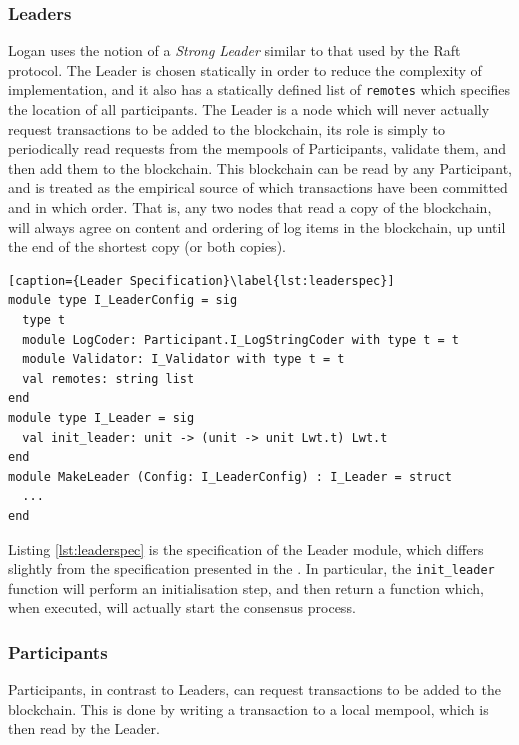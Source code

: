 \documentclass[12pt,a4paper,twoside,openright]{report}
\begin{document}
	\subsubsection*{Leaders}
	Logan uses the notion of a \textit{Strong Leader} similar to that used by the Raft protocol. 
	The Leader is chosen statically in order to reduce the complexity of implementation, and it also has a statically defined list of \texttt{remotes} which specifies the location of all participants.
	The Leader is a node which will never actually request transactions to be added to the blockchain, its role is simply to periodically read requests from the mempools of Participants, validate them, and then add them to the blockchain.
	This blockchain can be read by any Participant, and is treated as the empirical source of which transactions have been committed and in which order. 
	That is, any two nodes that read a copy of the blockchain, will always agree on content and ordering of log items in the blockchain, up until the end of the shortest copy (or both copies).\\

	\begin{lstlisting}[caption={Leader Specification}\label{lst:leaderspec}]
module type I_LeaderConfig = sig
  type t
  module LogCoder: Participant.I_LogStringCoder with type t = t   
  module Validator: I_Validator with type t = t 
  val remotes: string list
end
module type I_Leader = sig
  val init_leader: unit -> (unit -> unit Lwt.t) Lwt.t
end
module MakeLeader (Config: I_LeaderConfig) : I_Leader = struct
  ...
end
	\end{lstlisting}

	Listing \ref{lst:leaderspec} is the specification of the Leader module, which differs slightly from the specification presented in the .
	In particular, the \texttt{init\_leader} function will perform an initialisation step, and then return a function which, when executed, will actually start the consensus process.

	\subsubsection*{Participants}
	Participants, in contrast to Leaders, can request transactions to be added to the blockchain. 
	This is done by writing a transaction to a local mempool, which is then read by the Leader.\\
\end{document}
